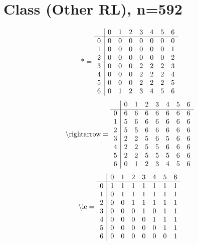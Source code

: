 \documentclass[11pt]{article}
\begin{document}
\section{Class (Other RL), n=592}
\[\text{*} = 
\begin{array}{r | r r r r r r r}
 & 0 & 1 & 2 & 3 & 4 & 5 & 6 \\ \hline
0 & 0 & 0 & 0 & 0 & 0 & 0 & 0 \\
1 & 0 & 0 & 0 & 0 & 0 & 0 & 1 \\
2 & 0 & 0 & 0 & 0 & 0 & 0 & 2 \\
3 & 0 & 0 & 0 & 2 & 2 & 2 & 3 \\
4 & 0 & 0 & 0 & 2 & 2 & 2 & 4 \\
5 & 0 & 0 & 0 & 2 & 2 & 2 & 5 \\
6 & 0 & 1 & 2 & 3 & 4 & 5 & 6 \\
\end{array}
\]
\[\text{\textbackslash rightarrow} = 
\begin{array}{r | r r r r r r r}
 & 0 & 1 & 2 & 3 & 4 & 5 & 6 \\ \hline
0 & 6 & 6 & 6 & 6 & 6 & 6 & 6 \\
1 & 5 & 6 & 6 & 6 & 6 & 6 & 6 \\
2 & 5 & 5 & 6 & 6 & 6 & 6 & 6 \\
3 & 2 & 2 & 5 & 6 & 5 & 6 & 6 \\
4 & 2 & 2 & 5 & 5 & 6 & 6 & 6 \\
5 & 2 & 2 & 5 & 5 & 5 & 6 & 6 \\
6 & 0 & 1 & 2 & 3 & 4 & 5 & 6 \\
\end{array}
\]
\[\text{\textbackslash le} = 
\begin{array}{r | r r r r r r r}
 & 0 & 1 & 2 & 3 & 4 & 5 & 6 \\ \hline
0 & 1 & 1 & 1 & 1 & 1 & 1 & 1 \\
1 & 0 & 1 & 1 & 1 & 1 & 1 & 1 \\
2 & 0 & 0 & 1 & 1 & 1 & 1 & 1 \\
3 & 0 & 0 & 0 & 1 & 0 & 1 & 1 \\
4 & 0 & 0 & 0 & 0 & 1 & 1 & 1 \\
5 & 0 & 0 & 0 & 0 & 0 & 1 & 1 \\
6 & 0 & 0 & 0 & 0 & 0 & 0 & 1 \\
\end{array}
\]
\end{document}
